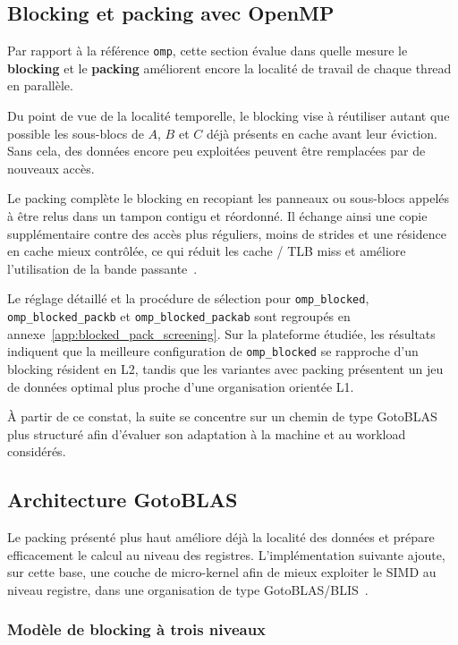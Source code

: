 \documentclass[a4paper,11pt,oneside]{article}
\begin{document}
\subsection{Blocking et packing avec OpenMP}

Par rapport à la référence \texttt{omp}, cette section évalue dans quelle mesure le \textbf{blocking} et le \textbf{packing} améliorent encore la localité de travail de chaque thread en parallèle.

Du point de vue de la localité temporelle, le blocking vise à réutiliser autant que possible les sous-blocs de $A$, $B$ et $C$ déjà présents en cache avant leur éviction. Sans cela, des données encore peu exploitées peuvent être remplacées par de nouveaux accès.

Le packing complète le blocking en recopiant les panneaux ou sous-blocs appelés à être relus dans un tampon contigu et réordonné. Il échange ainsi une copie supplémentaire contre des accès plus réguliers, moins de strides et une résidence en cache mieux contrôlée, ce qui réduit les cache / TLB miss et améliore l'utilisation de la bande passante~\cite{goto2008anatomy,vanzee2015blis}.

Le réglage détaillé et la procédure de sélection pour \texttt{omp\_blocked}, \texttt{omp\_blocked\_packb} et \texttt{omp\_blocked\_packab} sont regroupés en annexe~\ref{app:blocked_pack_screening}. Sur la plateforme étudiée, les résultats indiquent que la meilleure configuration de \texttt{omp\_blocked} se rapproche d'un blocking résident en L2, tandis que les variantes avec packing présentent un jeu de données optimal plus proche d'une organisation orientée L1.

À partir de ce constat, la suite se concentre sur un chemin de type GotoBLAS plus structuré afin d'évaluer son adaptation à la machine et au workload considérés.

\subsection{Architecture GotoBLAS}\label{sec:gotoblas_arch}

Le packing présenté plus haut améliore déjà la localité des données et prépare efficacement le calcul au niveau des registres. L'implémentation suivante ajoute, sur cette base, une couche de micro-kernel afin de mieux exploiter le SIMD au niveau registre, dans une organisation de type GotoBLAS/BLIS~\cite{goto2008anatomy,vanzee2015blis}.

\subsubsection{Modèle de blocking à trois niveaux}
\end{document}
